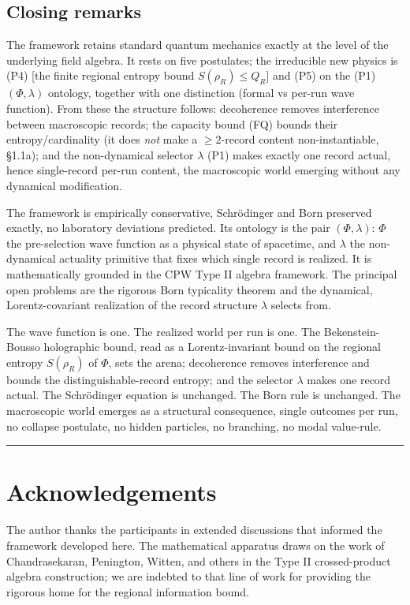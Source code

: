 \documentclass[11pt,a4paper]{article}
\begin{document}
\subsection{Closing remarks}

The framework retains standard quantum mechanics exactly at the level of the underlying field algebra. It rests on five postulates; the irreducible new physics is (P4) [the finite regional entropy bound $S(\rho_R) \le Q_R$] and (P5) on the (P1) $(\Phi,\lambda)$ ontology, together with one distinction (formal vs per-run wave function). From these the structure follows: decoherence removes interference between macroscopic records; the capacity bound (FQ) bounds their entropy/cardinality (it does \emph{not} make a $\ge 2$-record content non-instantiable, §1.1a); and the non-dynamical selector $\lambda$ (P1) makes exactly one record actual, hence single-record per-run content, the macroscopic world emerging without any dynamical modification.

The framework is empirically conservative, Schrödinger and Born preserved exactly, no laboratory deviations predicted. Its ontology is the pair $(\Phi,\lambda)$: $\Phi$ the pre-selection wave function as a physical state of spacetime, and $\lambda$ the non-dynamical actuality primitive that fixes which single record is realized. It is mathematically grounded in the CPW Type II algebra framework. The principal open problems are the rigorous Born typicality theorem and the dynamical, Lorentz-covariant realization of the record structure $\lambda$ selects from.

The wave function is one. The realized world per run is one. The Bekenstein-Bousso holographic bound, read as a Lorentz-invariant bound on the regional entropy $S(\rho_R)$ of $\Phi$, sets the arena; decoherence removes interference and bounds the distinguishable-record entropy; and the selector $\lambda$ makes one record actual. The Schrödinger equation is unchanged. The Born rule is unchanged. The macroscopic world emerges as a structural consequence, single outcomes per run, no collapse postulate, no hidden particles, no branching, no modal value-rule.

\medskip\hrule\medskip

\section{Acknowledgements}

The author thanks the participants in extended discussions that informed the framework developed here. The mathematical apparatus draws on the work of Chandrasekaran, Penington, Witten, and others in the Type II crossed-product algebra construction; we are indebted to that line of work for providing the rigorous home for the regional information bound.
\end{document}
